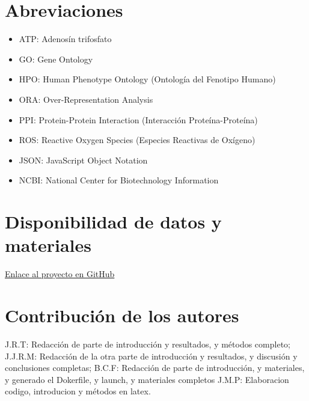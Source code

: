 \documentclass{bmcart}
\begin{document}
	\begin{backmatter}
	
		\section*{Abreviaciones}%
			\begin{itemize}
				\item ATP: Adenosín trifosfato
				\item GO: Gene Ontology
				\item HPO: Human Phenotype Ontology (Ontología del Fenotipo Humano)
				\item ORA: Over-Representation Analysis
				\item PPI: Protein-Protein Interaction (Interacción Proteína-Proteína)
				\item ROS: Reactive Oxygen Species (Especies Reactivas de Oxígeno)
				\item JSON: JavaScript Object Notation
				\item NCBI: National Center for Biotechnology Information
			\end{itemize}
		
		\section*{Disponibilidad de datos y materiales}%
			\href{https://github.com/juliadelrio0/project_template}{Enlace al proyecto en GitHub}
			
		
		\section*{Contribución de los autores}			
			J.R.T: Redacción de parte de introducción y resultados, y métodos completo; 
			J.J.R.M: Redacción de la otra parte de introducción y resultados, y discusión y conclusiones completas;
			B.C.F: Redacción de parte de introducción, y materiales, y generado el Dokerfile, y launch, y materiales completos
			J.M.P: Elaboracion codigo, introducion y métodos en latex.
			
		
		
		
	
	\end{backmatter}
\end{document}
